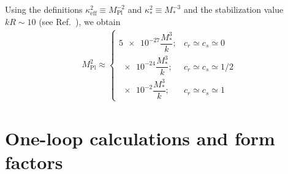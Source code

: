 \documentclass[twocolumn,showpacs,showkeys,prd,superscriptaddress]{revtex4-1}
\begin{document}

Using the definitions $\kappa_{\text{eff}}^2 \equiv M_{\text{Pl}}^{-2}$ and $\kappa_*^2 \equiv M_*^{-3}$ and the stabilization value $kR\sim10$ (see Ref.~\cite{Goldberger:1999uk}), we obtain %
\begin{align}
  M_{\text{Pl}}^2 \approx 
  \begin{cases}    
    \num{5e-27} \dfrac{M_*^3}{k};  & c_r\simeq c_s\simeq 0 \\[2ex]
    \num{e-24} \dfrac{M_*^3}{k};  & c_r\simeq c_s\simeq 1/2 \\[2ex]
    \num{e-2}\dfrac{M_*^3}{k};  & c_r\simeq c_s\simeq 1 
  \end{cases}
\end{align}





%

\section{\label{sec:oneloop}One-loop calculations and form factors}
\end{document}
